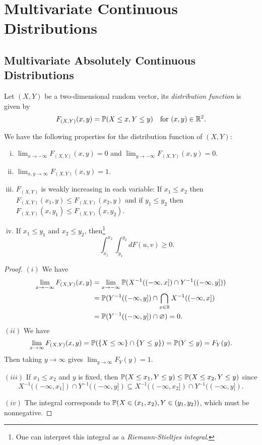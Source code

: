 \chapter{Multivariate Continuous Distributions}

\section{Multivariate Absolutely Continuous Distributions}
\begin{definition}
  Let $(X, Y)$ be a two-dimensional random vector,
  its \emph{distribution function} is given by
  \[
    F_{(X, Y)}(x, y) = \mathbb{P}(X \leq x, Y \leq y)
    \quad \text{for $(x, y) \in \mathbb{R}^2$}.
  \]
\end{definition}

\begin{prop}
  We have the following properties for the
  distribution function of $(X, Y)$:
  \begin{enumerate}[(i)]
    \item $\lim_{x \to -\infty} F_{(X, Y)}(x, y) = 0$
      and $\lim_{y \to -\infty} F_{(X, Y)}(x, y) = 0$.
    \item $\lim_{x, y \to \infty} F_{(X, Y)}(x, y) = 1$.
    \item $F_{(X, Y)}$ is weakly increasing
      in each variable: If $x_1 \le x_2$ then
      $F_{(X, Y)}(x_1, y) \le F_{(X, Y)}(x_2, y)$
      and if $y_1 \le y_2$ then
      $F_{(X, Y)}(x, y_1) \le F_{(X, Y)}(x, y_2)$.
    \item If $x_1 \le y_1$ and $x_2 \le y_2$, then\footnote{One can interpret this integral as a \emph{Riemann-Stieltjes integral}.}
      \[
        \int_{x_1}^{x_2} \int_{y_1}^{y_2} dF(u, v)
        \ge 0.
      \]
  \end{enumerate}
\end{prop}

\begin{proof}
  $(i)$ We have
  \begin{align*}
    \lim_{x \to -\infty} F_{(X, Y)}(x, y)
    &= \lim_{x \to -\infty} \mathbb{P}(X^{-1}((-\infty, x])
    \cap Y^{-1}((-\infty, y])) \\
    &= \mathbb{P}(Y^{-1}((-\infty, y]) \cap \bigcap_{x \in \mathbb{R}} X^{-1}((-\infty, x]) \\
    &= \mathbb{P}(Y^{-1}((-\infty, y]) \cap \varnothing)
    = 0.
  \end{align*}
  $(ii)$ We have
  \[
    \lim_{x \to \infty} F_{(X, Y)}(x, y)
    = \mathbb{P}(\{X \le \infty\} \cap \{Y \le y\})
    = \mathbb{P}(Y \le y) = F_Y(y).
  \]
  Then taking $y \to \infty$ gives
  $\lim_{y \to \infty} F_Y(y) = 1$.

  $(iii)$ If $x_1 \le x_2$ and $y$ is fixed, then
  $\mathbb{P}(X \le x_1, Y \le y) \le \mathbb{P}(X \le x_2, Y \le y)$ since
  \[
    X^{-1}((-\infty, x_1]) \cap Y^{-1}((-\infty, y])
    \subseteq X^{-1}((-\infty, x_2]) \cap Y^{-1}((-\infty, y]).
  \]

  $(iv)$ The integral corresponds to $\mathbb{P}(X \in (x_1, x_2), Y \in (y_1, y_2))$,
  which must be nonnegative.
\end{proof}

